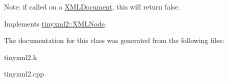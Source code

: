 Note\-: if called on a \hyperlink{classtinyxml2_1_1_x_m_l_document}{X\-M\-L\-Document}, this will return false. 

Implements \hyperlink{classtinyxml2_1_1_x_m_l_node_a7ce18b751c3ea09eac292dca264f9226}{tinyxml2\-::\-X\-M\-L\-Node}.



The documentation for this class was generated from the following files\-:\begin{DoxyCompactItemize}
\item 
tinyxml2.\-h\item 
tinyxml2.\-cpp\end{DoxyCompactItemize}
